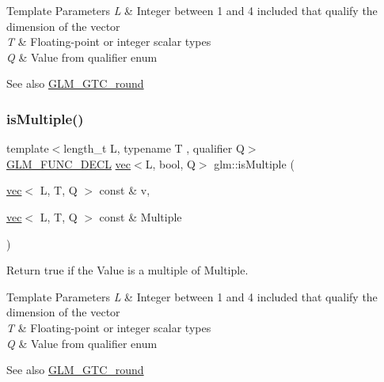 \begin{DoxyTemplParams}{Template Parameters}
{\em L} & Integer between 1 and 4 included that qualify the dimension of the vector \\
\hline
{\em T} & Floating-\/point or integer scalar types \\
\hline
{\em Q} & Value from qualifier enum\\
\hline
\end{DoxyTemplParams}
\begin{DoxySeeAlso}{See also}
\mbox{\hyperlink{group__gtc__round}{G\+L\+M\+\_\+\+G\+T\+C\+\_\+round}} 
\end{DoxySeeAlso}
\mbox{\label{group__gtc__round_gabb4360e38c0943d8981ba965dead519d}} 
\subsubsection{\texorpdfstring{is\+Multiple()}{isMultiple()}\hspace{0.1cm}{\footnotesize\ttfamily [3/3]}}
{\footnotesize\ttfamily template$<$length\+\_\+t L, typename T , qualifier Q$>$ \\
\mbox{\hyperlink{setup_8hpp_ab2d052de21a70539923e9bcbf6e83a51}{G\+L\+M\+\_\+\+F\+U\+N\+C\+\_\+\+D\+E\+CL}} \mbox{\hyperlink{structglm_1_1vec}{vec}}$<$L, bool, Q$>$ glm\+::is\+Multiple (\begin{DoxyParamCaption}\item[{\mbox{\hyperlink{structglm_1_1vec}{vec}}$<$ L, T, Q $>$ const \&}]{v,  }\item[{\mbox{\hyperlink{structglm_1_1vec}{vec}}$<$ L, T, Q $>$ const \&}]{Multiple }\end{DoxyParamCaption})}

Return true if the \textquotesingle{}Value\textquotesingle{} is a multiple of \textquotesingle{}Multiple\textquotesingle{}.


\begin{DoxyTemplParams}{Template Parameters}
{\em L} & Integer between 1 and 4 included that qualify the dimension of the vector \\
\hline
{\em T} & Floating-\/point or integer scalar types \\
\hline
{\em Q} & Value from qualifier enum\\
\hline
\end{DoxyTemplParams}
\begin{DoxySeeAlso}{See also}
\mbox{\hyperlink{group__gtc__round}{G\+L\+M\+\_\+\+G\+T\+C\+\_\+round}} 
\end{DoxySeeAlso}
\mbox{\label{group__gtc__round_gadf491730354aa7da67fbe23d4d688763}} 
